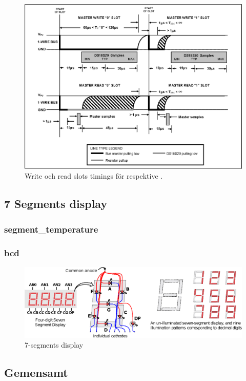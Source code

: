 \documentclass[a4paper]{scrreprt}
\begin{document}
\begin{figure}
\centering
\includegraphics[width=\textwidth]{write_slot.eps}
\caption{Write och read slots timings för \low{} respektive \high{}.}
\label{fig:rwslots}
\end{figure}


\subsection{7 Segments display}\label{sec:7seg}
\subsubsection{segment\_temperature}
\subsubsection{bcd}

\begin{figure}[htp]
\centering
\includegraphics[width=\textwidth]{segment.eps}
\caption{7-segments display}
\label{}
\end{figure}


\subsection{Gemensamt}
\end{document}

